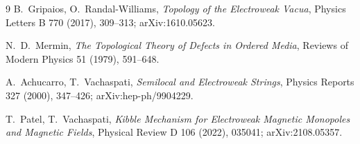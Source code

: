 \begin{thebibliography}{9}
B.~Gripaios, O.~Randal-Williams,
\emph{Topology of the Electroweak Vacua},
Physics Letters B 770 (2017), 309--313; arXiv:1610.05623.

N.~D.~Mermin,
\emph{The Topological Theory of Defects in Ordered Media},
Reviews of Modern Physics 51 (1979), 591--648.

A.~Achucarro, T.~Vachaspati,
\emph{Semilocal and Electroweak Strings},
Physics Reports 327 (2000), 347--426; arXiv:hep-ph/9904229.

T.~Patel, T.~Vachaspati,
\emph{Kibble Mechanism for Electroweak Magnetic Monopoles and Magnetic
Fields},
Physical Review D 106 (2022), 035041; arXiv:2108.05357.
\end{thebibliography}